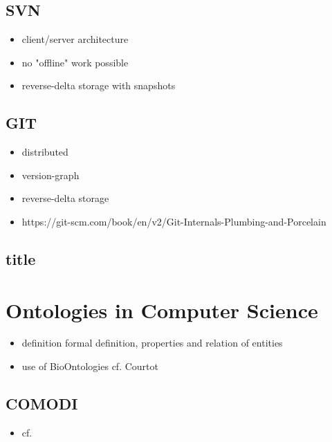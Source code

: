 	\subsection{SVN}
	\begin{itemize}
	\item client/server architecture
	\item no "offline" work possible
	\item reverse-delta storage with snapshots
	\end{itemize}
	
	\subsection{GIT}
	\begin{itemize}
	\item distributed
	\item version-graph
	\item reverse-delta storage
	\item https://git-scm.com/book/en/v2/Git-Internals-Plumbing-and-Porcelain
	\end{itemize}
	
	\subsection{title}



\section{Ontologies in Computer Science}

\begin{itemize}
\item definition
	\subitem formal definition, properties and relation of entities
\item use of BioOntologies cf. Courtot
\end{itemize}

	
	\subsection{COMODI}
	\begin{itemize}
		\item cf. \cite{Scharm2016}
	\end{itemize}
	
